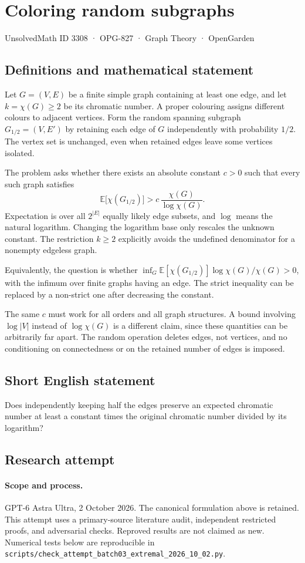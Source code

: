 \documentclass[11pt,a4paper]{article}
\begin{document}
\section*{Coloring random subgraphs}\label{3308}
{\small UnsolvedMath ID 3308 · OPG-827 · Graph Theory · OpenGarden}
\subsection{Definitions and mathematical statement}
Let $G=(V,E)$ be a finite simple graph containing at least one edge,
and let $k=\chi(G)\ge2$ be its chromatic number. A proper colouring
assigns different colours to adjacent vertices. Form the random
spanning subgraph $G_{1/2}=(V,E')$ by retaining each edge of $G$
independently with probability $1/2$. The vertex set is unchanged,
even when retained edges leave some vertices isolated.

The problem asks whether there exists an absolute constant $c>0$
such that every such graph satisfies
\[
                   \mathbb E\bigl[\chi(G_{1/2})\bigr]
                      >c\,\frac{\chi(G)}{\log\chi(G)}.
\]
Expectation is over all $2^{|E|}$ equally likely edge subsets, and
$\log$ means the natural logarithm. Changing the logarithm base only
rescales the unknown constant. The restriction $k\ge2$ explicitly
avoids the undefined denominator for a nonempty edgeless graph.

Equivalently, the question is whether
$\inf_G\mathbb E[\chi(G_{1/2})]\log\chi(G)/\chi(G)>0$, with the
infimum over finite graphs having an edge. The strict inequality can
be replaced by a non-strict one after decreasing the constant.

The same $c$ must work for all orders and all graph structures. A
bound involving $\log|V|$ instead of $\log\chi(G)$ is a different
claim, since these quantities can be arbitrarily far apart. The
random operation deletes edges, not vertices, and no conditioning
on connectedness or on the retained number of edges is imposed.
\subsection{Short English statement}
Does independently keeping half the edges preserve an expected chromatic number at least a constant times the original chromatic number divided by its logarithm?
\subsection{Research attempt}
\paragraph{Scope and process.}
GPT-6 Astra Ultra, 2 October 2026. The canonical formulation above is retained. This attempt uses a primary-source literature audit, independent restricted proofs, and adversarial checks. Reproved results are not claimed as new. Numerical tests below are reproducible in \texttt{scripts/check\_attempt\_batch03\_extremal\_2026\_10\_02.py}.
\end{document}
